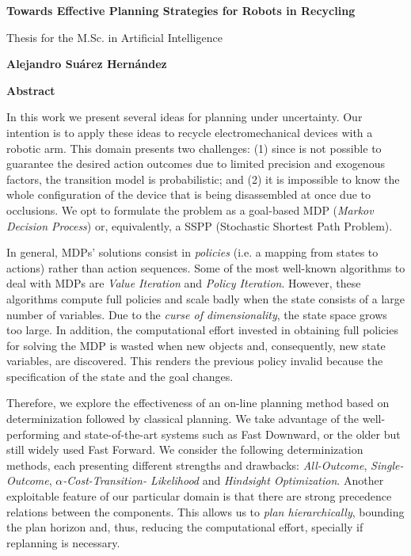 \thispagestyle{plain}
\begin{center}
	\Large
	\textbf{Towards Effective Planning Strategies for Robots in Recycling}
	
	\vspace{0.4cm}
	\large
	Thesis for the M.Sc. in Artificial Intelligence
	
	\vspace{0.4cm}
	\textbf{Alejandro Suárez Hernández}
	
	\vspace{0.9cm}
	\textbf{Abstract}
\end{center}

In this work we present several ideas for planning under 
uncertainty. Our intention is to apply these ideas to recycle
electromechanical devices with a robotic arm. This domain presents two
challenges: (1) since is not possible to guarantee the desired
action outcomes due to limited precision and exogenous factors,
the transition model
is probabilistic;
and (2) it is impossible to know the whole configuration of the
device that is being
disassembled at once due to occlusions. We opt to
formulate the problem as
a goal-based MDP (\emph{Markov Decision Process}) or, equivalently,
a SSPP
(Stochastic Shortest Path Problem).

In general, MDPs' solutions consist
in \emph{policies} (i.e. a mapping from states to actions) rather than action sequences.
Some of the most well-known algorithms
to deal with MDPs are \emph{Value Iteration} and \emph{Policy Iteration}.
However, these algorithms compute full policies and scale badly
when the state consists of a large number of variables. Due to the
\emph{curse of dimensionality}, the state space grows too large.
In addition, the computational effort invested in obtaining full policies for
solving the MDP is wasted when new objects and, consequently,
new state variables, are discovered. This renders the
previous policy invalid because the specification of the state
and the goal changes.

Therefore, we explore the effectiveness of an on-line planning method
based on determinization followed by classical planning. We take advantage
of the well-performing and state-of-the-art systems such as Fast Downward,
or the older but still widely used Fast Forward. We consider the following
determinization methods, each presenting different strengths and
drawbacks: \emph{All-Outcome}, \emph{Single-Outcome}, \emph{$ \alpha $-Cost-Transition-%
Likelihood} and \emph{Hindsight Optimization}. Another exploitable feature
of our particular domain is that there are strong precedence relations
between the components. This allows us to \emph{plan hierarchically},
bounding the plan horizon and, thus, reducing the computational effort,
specially if replanning is necessary.

